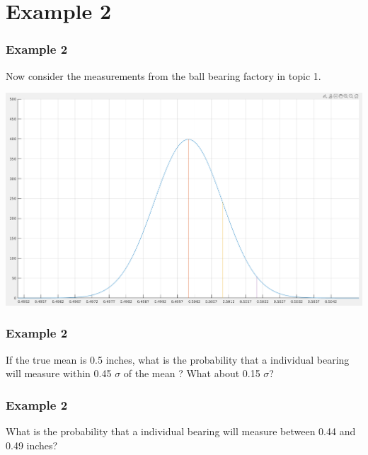 \documentclass[fleqn]{beamer} %
\newcommand{\sectiontitleIII}{Example 2}
\begin{document}
\section{\sectiontitleIII}	

	\begin{frame}[label=sectionIII] \small
		\frametitle{\sectiontitleIII}    
		
		Now consider the measurements from the ball bearing factory in topic 1. 
		
		\includegraphics[scale=.2]{topic3_fig1.png}	
	
		
			
		
		\vspace{30mm}
		
		
		

	\end{frame}

	\begin{frame}[label=sectionIII] \small
		\frametitle{\sectiontitleIII}    
		
		
	If the true mean is 0.5 inches, what is the probability that a individual bearing will measure within 0.45 $\sigma$ of the mean ? What about 0.15 $\sigma$? \\
		\vspace{30mm}

	\end{frame}

	\begin{frame}[label=sectionIII] \small
		\frametitle{\sectiontitleIII}    
	
		What is the probability that a individual bearing will measure between 0.44 and 0.49 inches? \\\\
			\vspace{30mm}

	\end{frame}
\end{document}
